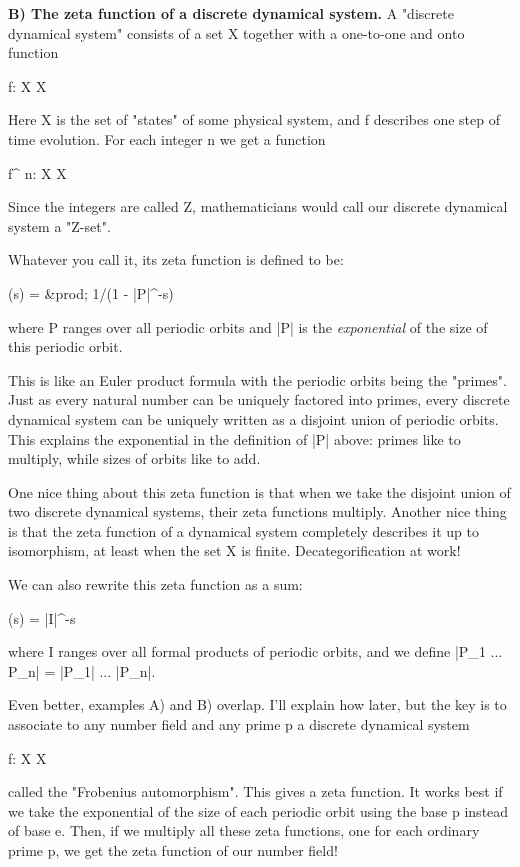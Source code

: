 \textbf{B) The zeta function of a discrete dynamical system.}  A "discrete
dynamical system" consists of a set X together with a one-to-one 
and onto function

f: X \to  X

Here X is the set of "states" of some physical system, and f describes 
one step of time evolution.  For each integer n we get a function

f^{ n}: X \to  X

Since the integers are called Z, mathematicians would call our
discrete dynamical system a "Z-set".

Whatever you call it, its zeta function is defined to be:

\zeta (s) = &prod;  1/(1 - |P|^{-s})

where P ranges over all periodic orbits and |P| is the 
\emph{exponential} of the size of this periodic orbit.  

This is like an Euler product formula with the periodic orbits 
being the "primes".  Just as every natural number can be uniquely 
factored into primes, every discrete dynamical system can be 
uniquely written as a disjoint union of periodic orbits.  
This explains the exponential in the definition of |P| above:
primes like to multiply, while sizes of orbits like to add.

One nice thing about this zeta function is that when we take
the disjoint union of two discrete dynamical systems, their zeta
functions multiply.  Another nice thing is that the zeta function
of a dynamical system completely describes it up to isomorphism, 
at least when the set X is finite.  Decategorification at work!
 
We can also rewrite this zeta function as a sum:

\zeta (s) = \sum  |I|^{-s}

where I ranges over all formal products of periodic orbits,
and we define |P_{1} ... P_{n}| = |P_{1}| ... |P_{n}|.  

Even better, examples A) and B) overlap.  I'll explain how later, but 
the key is to associate to any number field and any prime p a discrete 
dynamical system

f: X \to  X

called the "Frobenius automorphism".  This gives a zeta function.
It works best if we take the exponential of the size of each
periodic orbit using the base p instead of base e.   Then, if we 
multiply all these zeta functions, one for each ordinary prime p, 
we get the zeta function of our number field!  

